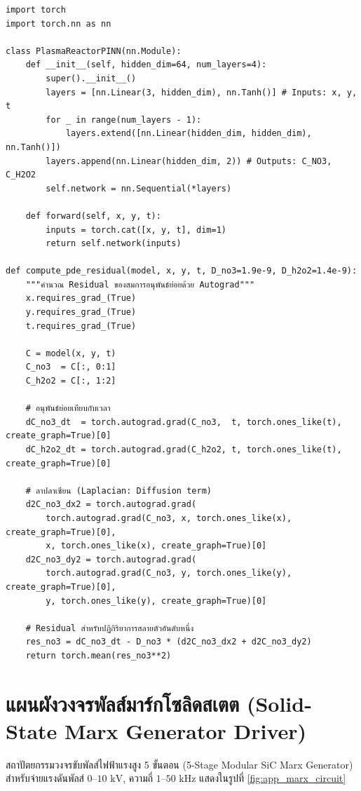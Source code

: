 \begin{verbatim}
import torch
import torch.nn as nn

class PlasmaReactorPINN(nn.Module):
    def __init__(self, hidden_dim=64, num_layers=4):
        super().__init__()
        layers = [nn.Linear(3, hidden_dim), nn.Tanh()] # Inputs: x, y, t
        for _ in range(num_layers - 1):
            layers.extend([nn.Linear(hidden_dim, hidden_dim), nn.Tanh()])
        layers.append(nn.Linear(hidden_dim, 2)) # Outputs: C_NO3, C_H2O2
        self.network = nn.Sequential(*layers)

    def forward(self, x, y, t):
        inputs = torch.cat([x, y, t], dim=1)
        return self.network(inputs)

def compute_pde_residual(model, x, y, t, D_no3=1.9e-9, D_h2o2=1.4e-9):
    """คำนวณ Residual ของสมการอนุพันธ์ย่อยด้วย Autograd"""
    x.requires_grad_(True)
    y.requires_grad_(True)
    t.requires_grad_(True)

    C = model(x, y, t)
    C_no3  = C[:, 0:1]
    C_h2o2 = C[:, 1:2]

    # อนุพันธ์ย่อยเทียบกับเวลา
    dC_no3_dt  = torch.autograd.grad(C_no3,  t, torch.ones_like(t),  create_graph=True)[0]
    dC_h2o2_dt = torch.autograd.grad(C_h2o2, t, torch.ones_like(t), create_graph=True)[0]

    # ลาปลาเซียน (Laplacian: Diffusion term)
    d2C_no3_dx2 = torch.autograd.grad(
        torch.autograd.grad(C_no3, x, torch.ones_like(x), create_graph=True)[0],
        x, torch.ones_like(x), create_graph=True)[0]
    d2C_no3_dy2 = torch.autograd.grad(
        torch.autograd.grad(C_no3, y, torch.ones_like(y), create_graph=True)[0],
        y, torch.ones_like(y), create_graph=True)[0]

    # Residual สำหรับปฏิกิริยาการสลายตัวอันดับหนึ่ง
    res_no3 = dC_no3_dt - D_no3 * (d2C_no3_dx2 + d2C_no3_dy2)
    return torch.mean(res_no3**2)
\end{verbatim}

\section{แผนผังวงจรพัลส์มาร์กโซลิดสเตต (Solid-State Marx Generator Driver)}
\label{app:sec_marx_schematic}

สถาปัตยกรรมวงจรขับพัลส์ไฟฟ้าแรงสูง 5 ขั้นตอน (5-Stage Modular SiC Marx Generator) สำหรับจ่ายแรงดันพัลส์ $0$--$10\text{ kV}$, ความถี่ $1$--$50\text{ kHz}$ แสดงในรูปที่ \ref{fig:app_marx_circuit}


